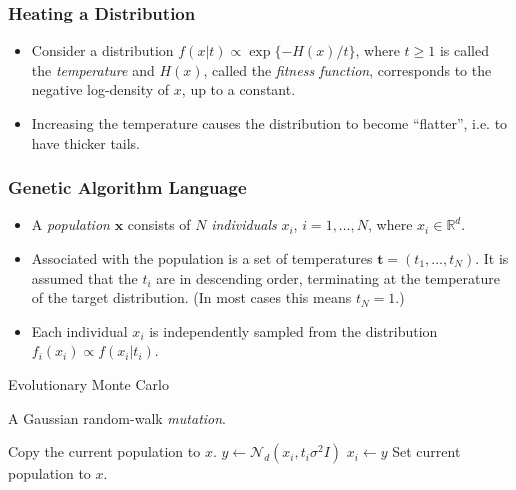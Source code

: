 \documentclass{beamer}\usepackage[]{graphicx}\usepackage[]{color}
\newcommand{\bt}{\mathbf t}
\begin{document}
\begin{frame}
  \frametitle{Heating a Distribution}
  \begin{itemize}
  \item Consider a distribution $f(x|t) \propto \exp\{
    -H(x)/t \}$, where $t\ge 1$ is called the \emph{temperature} and
    $H(x)$, called the \emph{fitness function}, corresponds to the
    negative log-density of $x$, up to a constant.
  \item Increasing the temperature causes the distribution to become
    ``flatter'', i.e. to have thicker tails.
  \end{itemize}
\end{frame}

\begin{frame}
  \frametitle{Genetic Algorithm Language}
  \begin{itemize}
  \item A \emph{population} $\mathbf{x}$ consists of $N$
    \emph{individuals} $x_i$, $i = 1, \ldots, N$, where $x_i \in
    \mathbb{R}^d$.
  \item Associated with the population is a set of temperatures $\bt
    = (t_1,\ldots,t_N)$. It is assumed that the $t_i$ are in
    descending order, terminating at the temperature of the target
    distribution. (In most cases this means $t_N =1$.)
  \item Each individual $x_i$ is independently sampled from the
    distribution $f_i(x_i) \propto f(x_i|t_i)$.
  \end{itemize}
\end{frame}

\begin{frame}
\begin{algorithm}[H]
\caption{Evolutionary Monte Carlo}
  \label{alg:emc}
  \footnotesize
  \begin{algorithmic}
     
    \State {}
    \Ow 
    \State {}
    \EndWp
    \State  {}
    \EndProcedure
  \end{algorithmic}
\end{algorithm}
\end{frame}

 \begin{frame}
 \begin{algorithm}[H]
   \caption{A Gaussian random-walk {\it mutation}.}
   \label{alg:mutate}
   \footnotesize
   \begin{algorithmic}
     \State Copy the current population to $x$.
     \State $y \gets \mathcal N_d(x_i,t_i \sigma^2I)$
     \State $x_i \gets y$
     \EndWp
     \EndFor
     \State Set current population to $x$.
     \EndProcedure
   \end{algorithmic}
 \end{algorithm}
 \end{frame}
\end{document}
